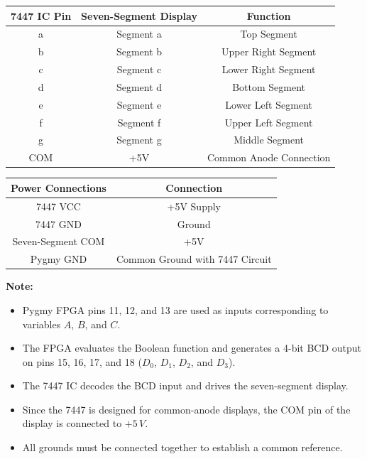 \documentclass[12pt,a4paper]{article}
\begin{document}
\vspace{0.5cm}

\begin{center}
\begin{tabular}{|c|c|c|}
\hline
\textbf{7447 IC Pin} & \textbf{Seven-Segment Display} & \textbf{Function} \\
\hline
a & Segment a & Top Segment \\
\hline
b & Segment b & Upper Right Segment \\
\hline
c & Segment c & Lower Right Segment \\
\hline
d & Segment d & Bottom Segment \\
\hline
e & Segment e & Lower Left Segment \\
\hline
f & Segment f & Upper Left Segment \\
\hline
g & Segment g & Middle Segment \\
\hline
COM & +5V & Common Anode Connection \\
\hline
\end{tabular}
\end{center}

\vspace{0.5cm}

\begin{center}
\begin{tabular}{|c|c|}
\hline
\textbf{Power Connections} & \textbf{Connection} \\
\hline
7447 VCC & +5V Supply \\
\hline
7447 GND & Ground \\
\hline
Seven-Segment COM & +5V \\
\hline
Pygmy GND & Common Ground with 7447 Circuit \\
\hline
\end{tabular}
\end{center}

\textbf{Note:}
\begin{itemize}
    \item Pygmy FPGA pins 11, 12, and 13 are used as inputs corresponding to variables \(A\), \(B\), and \(C\).
    \item The FPGA evaluates the Boolean function and generates a 4-bit BCD output on pins 15, 16, 17, and 18 (\(D_0\), \(D_1\), \(D_2\), and \(D_3\)).
    \item The 7447 IC decodes the BCD input and drives the seven-segment display.
    \item Since the 7447 is designed for common-anode displays, the COM pin of the display is connected to \(+5\,V\).
    \item All grounds must be connected together to establish a common reference.
\end{itemize}
\end{document}
